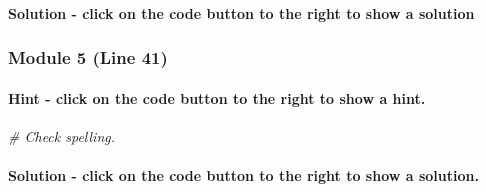 \documentclass[
]{article}
\newenvironment{Shaded}{\begin{snugshade}}{\end{snugshade}}
\newcommand{\CommentTok}[1]{\textcolor[rgb]{0.56,0.35,0.01}{\textit{#1}}}
\newcommand{\DecValTok}[1]{\textcolor[rgb]{0.00,0.00,0.81}{#1}}
\newcommand{\KeywordTok}[1]{\textcolor[rgb]{0.13,0.29,0.53}{\textbf{#1}}}
\newcommand{\NormalTok}[1]{#1}
\newcommand{\OperatorTok}[1]{\textcolor[rgb]{0.81,0.36,0.00}{\textbf{#1}}}
\newcommand{\StringTok}[1]{\textcolor[rgb]{0.31,0.60,0.02}{#1}}
\begin{document}
\hypertarget{solution---click-on-the-code-button-to-the-right-to-show-a-solution-1}{%
\paragraph{Solution - click on the code button to the right to show a
solution}\label{solution---click-on-the-code-button-to-the-right-to-show-a-solution-1}}

\begin{Shaded}
\end{Shaded}

\hypertarget{module-5-line-41}{%
\subsubsection{Module 5 (Line 41)}\label{module-5-line-41}}

\hypertarget{hint---click-on-the-code-button-to-the-right-to-show-a-hint.-1}{%
\paragraph{Hint - click on the code button to the right to show a
hint.}\label{hint---click-on-the-code-button-to-the-right-to-show-a-hint.-1}}

\begin{Shaded}
\begin{Highlighting}[]
\CommentTok{# Check spelling.}
\end{Highlighting}
\end{Shaded}

\hypertarget{solution---click-on-the-code-button-to-the-right-to-show-a-solution.-2}{%
\paragraph{Solution - click on the code button to the right to show a
solution.}\label{solution---click-on-the-code-button-to-the-right-to-show-a-solution.-2}}
\end{document}
